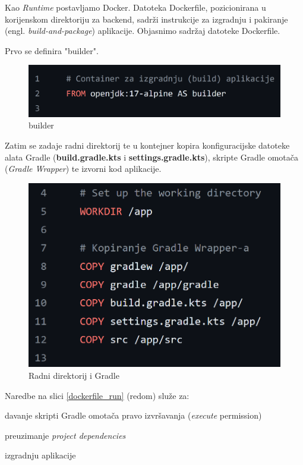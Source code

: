 			Kao \textit{Runtime} postavljamo Docker. Datoteka Dockerfile, pozicionirana u korijenskom direktoriju za backend, sadrži instrukcije za izgradnju i pakiranje (engl. \textit{build-and-package}) aplikacije. Objasnimo sadržaj datoteke Dockerfile.
			
			Prvo se definira "builder".
			
			\begin{figure}[H]
				\includegraphics[scale=0.5]{slike/dockerfile_builder.PNG} 
				\centering
				\caption{builder}
				\label{dockerfile_builder}
			\end{figure}
			
			Zatim se zadaje radni direktorij te u kontejner kopira konfiguracijske datoteke alata Gradle (\textbf{build.gradle.kts} i \textbf{settings.gradle.kts}), skripte Gradle omotača (\textit{Gradle Wrapper}) te izvorni kod aplikacije.
			
			\begin{figure}[H]
				\includegraphics[scale=0.6]{slike/dockerfile_workdir.PNG} 
				\centering
				\caption{Radni direktorij i Gradle}
				\label{dockerfile_workdir}
			\end{figure}
			
			Naredbe na slici \ref{dockerfile_run} (redom) služe za: 
			\begin{packed_item}
				\item davanje skripti Gradle omotača pravo izvršavanja (\textit{execute} permission)
				\item preuzimanje \textit{project dependencies}
				\item izgradnju aplikacije
			\end{packed_item}
			
